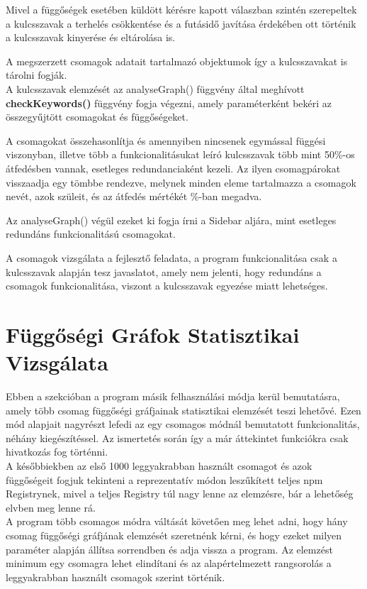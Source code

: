 Mivel a függőségek esetében küldött kérésre kapott válaszban szintén szerepeltek a kulcsszavak a terhelés csökkentése és a futásidő javítása érdekében ott történik a kulcsszavak kinyerése és eltárolása is.

A megszerzett csomagok adatait tartalmazó objektumok így a kulcsszavakat is tárolni fogják.\\

A kulcsszavak elemzését az analyseGraph() függvény által meghívott \textbf{checkKeywords()} függvény fogja végezni, amely paraméterként bekéri az összegyűjtött csomagokat és függőségeket.

A csomagokat összehasonlítja és amennyiben nincsenek egymással függési viszonyban, illetve több a funkcionalitásukat leíró kulcsszavak több mint 50\%-os átfedésben vannak, esetleges redundanciaként kezeli.
Az ilyen csomagpárokat visszaadja egy tömbbe rendezve, melynek minden eleme tartalmazza a csomagok nevét, azok szüleit, és az átfedés mértékét \%-ban megadva.

Az analyseGraph() végül ezeket ki fogja írni a Sidebar aljára, mint esetleges redundáns funkcionalitású csomagokat.

A csomagok vizsgálata a fejlesztő feladata, a program funkcionalitása csak a kulcsszavak alapján tesz javaslatot, amely nem jelenti, hogy redundáns a csomagok funkcionalitása, viszont a kulcsszavak egyezése miatt lehetséges. 

\section{Függőségi Gráfok Statisztikai Vizsgálata}

Ebben a szekcióban a program másik felhasználási módja kerül bemutatásra, amely több csomag függőségi gráfjainak statisztikai elemzését teszi lehetővé.
Ezen mód alapjait nagyrészt lefedi az egy csomagos módnál bemutatott funkcionalitás, néhány kiegészítéssel. Az ismertetés során így a már áttekintet funkciókra csak hivatkozás fog történni.\\
 
A későbbiekben az első 1000 leggyakrabban használt csomagot és azok függőségeit fogjuk tekinteni a reprezentatív módon leszűkített teljes npm Registrynek, mivel a teljes Registry túl nagy lenne az elemzésre, bár a lehetőség elvben meg lenne rá.\\

A program több csomagos módra váltását követően meg lehet adni, hogy hány csomag függőségi gráfjának elemzését szeretnénk kérni, és hogy ezeket milyen paraméter alapján állítsa sorrendben és adja vissza a program. Az elemzést minimum egy csomagra lehet elindítani és az alapértelmezett rangsorolás a leggyakrabban használt csomagok szerint történik.\\

